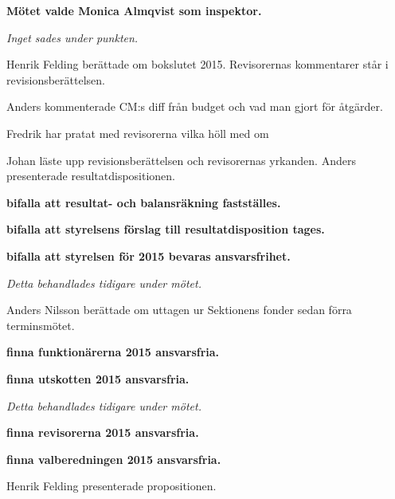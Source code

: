 \documentclass[10pt]{article}
\begin{document}
	\begin{paragrafer} \item[] %
	\begin{paragrafer}

    \textbf{Mötet valde Monica Almqvist som inspektor.}

\end{paragrafer}

\emph{Inget sades under punkten.}

Henrik Felding berättade om bokslutet 2015. Revisorernas kommentarer står i revisionsberättelsen.

Anders kommenterade CM:s diff från budget och vad man gjort för åtgärder.

Fredrik har pratat med revisorerna vilka höll med om

Johan läste upp revisionsberättelsen och revisorernas yrkanden. Anders presenterade resultatdispositionen.

\textbf{\Mba bifalla att resultat- och balansräkning fastställes.}

\textbf{\Mba bifalla att styrelsens förslag till resultatdisposition tages.}

\textbf{\Mba bifalla att styrelsen för 2015 bevaras ansvarsfrihet.}

\emph{Detta behandlades tidigare under mötet.}

Anders Nilsson berättade om uttagen ur Sektionens fonder sedan förra terminsmötet.

    \begin{paragrafer}
        \textbf{\Mba finna funktionärerna 2015 ansvarsfria.}

        \textbf{\Mba finna utskotten 2015 ansvarsfria.}

        \emph{Detta behandlades tidigare under mötet.}

        \textbf{\Mba finna revisorerna 2015 ansvarsfria.}

        \textbf{\Mba finna valberedningen 2015 ansvarsfria.}

    \end{paragrafer}
  \begin{paragrafer}
        Henrik Felding presenterade propositionen.


\end{paragrafer}
\end{paragrafer}
\end{document}
